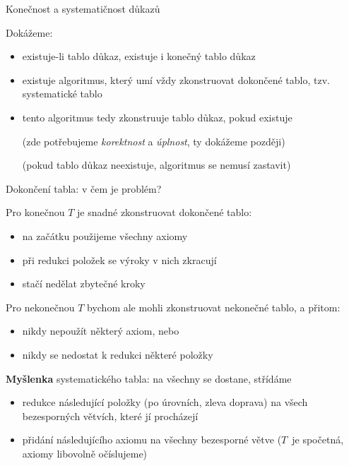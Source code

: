 \documentclass{beamer}
\begin{document}
\begin{frame}{Konečnost a systematičnost důkazů}

    Dokážeme:
    \begin{itemize}
        \item existuje-li tablo důkaz, existuje i \alert{konečný} tablo důkaz
        \item existuje algoritmus, který umí vždy zkonstruovat dokončené tablo, tzv. \alert{systematické tablo}
        \item tento algoritmus tedy \alert{zkonstruuje tablo důkaz}, pokud existuje 
        
        \medskip

        (zde potřebujeme \emph{korektnost} a \emph{úplnost}, ty dokážeme později)    
        
        \medskip

        (pokud tablo důkaz neexistuje, algoritmus se nemusí zastavit)
    \end{itemize}
    

\end{frame}


\begin{frame}{Dokončení tabla: v čem je problém?}

    Pro konečnou $T$ je snadné zkonstruovat dokončené tablo:
    \begin{itemize}
        \item na začátku použijeme všechny axiomy
        \item při redukci položek se výroky v nich zkracují
        \item stačí nedělat zbytečné kroky
    \end{itemize}

    Pro \alert{nekonečnou} $T$ bychom ale mohli zkonstruovat nekonečné tablo, a přitom:
    \begin{itemize}
        \item nikdy nepoužít některý axiom, nebo
        \item nikdy se nedostat k redukci některé položky
    \end{itemize}
        
    \textbf{Myšlenka} \alert{systematického tabla}: na všechny se dostane, střídáme
    \begin{itemize}
        \item \alert{redukce následující položky} (po úrovních, zleva doprava) na všech bezesporných větvích, které jí procházejí 
        \item \alert{přidání následujícího axiomu} na všechny bezesporné větve ($T$~je spočetná, axiomy libovolně očíslujeme)         
    \end{itemize}

\end{frame}
\end{document}
